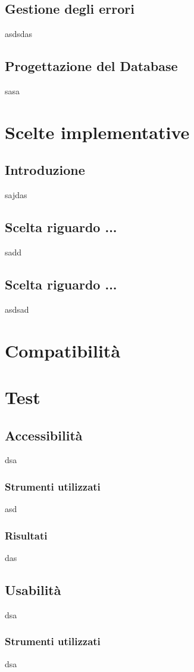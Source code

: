 \documentclass[12pt]{article}
\begin{document}
	\subsection{Gestione degli errori}
	asdsdas
	\subsection{Progettazione del Database}
	sasa
	
	\section{Scelte implementative}
	\subsection{Introduzione}
	sajdas
	\subsection{Scelta riguardo ...}
	sadd
	\subsection{Scelta riguardo ...}
	asdsad
	
	\section{Compatibilità}
	
	\section{Test}
	\subsection{Accessibilità}
	dsa
	\subsubsection{Strumenti utilizzati}
	asd
	\subsubsection{Risultati}
	das
	
	\subsection{Usabilità}
	dsa
	\subsubsection{Strumenti utilizzati}
	dsa
\end{document}
